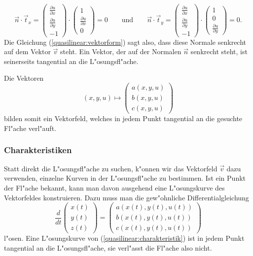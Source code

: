\[
\vec n\cdot\vec t_x
=
\begin{pmatrix}
\frac{\partial u}{\partial x}\\
\frac{\partial u}{\partial y}\\
-1
\end{pmatrix}
\cdot
\begin{pmatrix}1\\\frac{\partial u}{\partial x}\\0\end{pmatrix}
=0
\qquad
\text{und}
\qquad
\vec n\cdot\vec t_y
=
\begin{pmatrix}
\frac{\partial u}{\partial x}\\
\frac{\partial u}{\partial y}\\
-1
\end{pmatrix}
\cdot
\begin{pmatrix}1\\0\\\frac{\partial u}{\partial y}\end{pmatrix}
=0.
\]
Die Gleichung (\ref{quasilinear:vektorform}) sagt also,
dass diese Normale senkrecht auf dem Vektor $\vec v$ steht.
Ein Vektor, der auf der Normalen $\vec n$ senkrecht steht,
ist seinerseits tangential an die L"osungsfl"ache.

Die Vektoren
\[
(x,y,u)\mapsto
\begin{pmatrix}
a(x,y,u)\\b(x,y,u)\\c(x,y,u)
\end{pmatrix}
\]
bilden somit ein Vektorfeld, welches in jedem Punkt tangential
an die gesuchte Fl"ache verl"auft.

\subsubsection{Charakteristiken}
Statt direkt die L"osungsfl"ache zu suchen, k"onnen wir das Vektorfeld
$\vec v$ dazu verwenden, einzelne Kurven in der L"osungsfl"ache
zu bestimmen.
Ist ein Punkt der Fl"ache bekannt,
kann man davon ausgehend eine L"osungskurve des Vektorfeldes konstruieren.
Dazu muss man die gew"ohnliche Differentialgleichung
\begin{equation}
\frac{d}{dt}\begin{pmatrix}x(t)\\y(t)\\z(t)\end{pmatrix}
=
\begin{pmatrix}
a(x(t),y(t),u(t))\\b(x(t),y(t),u(t))\\c(x(t),y(t),u(t))
\end{pmatrix}
\label{quasilinear:charakteristik}
\end{equation}
l"osen.
Eine L"osungskurve von (\ref{quasilinear:charakteristik}) ist in jedem
Punkt tangential an die L"osungsfl"ache, sie verl"asst die Fl"ache also
nicht.

